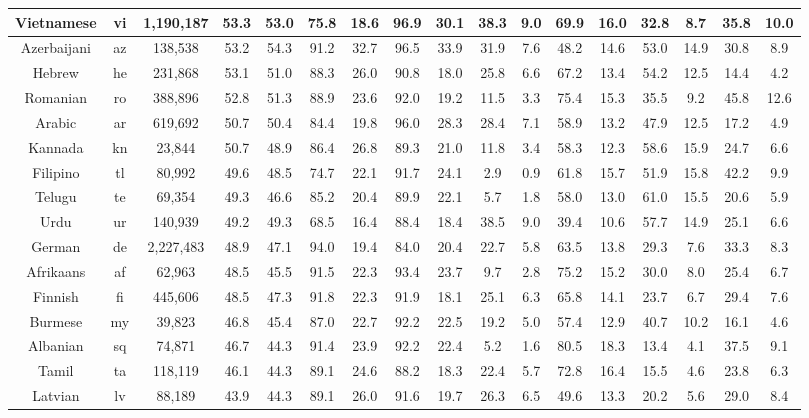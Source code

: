 \begin{table*}
{\begin{tabular}{|c|c|c||c|c|c|c|c|c|c|c|c|c|c|c|c|c|}
Vietnamese & vi & 1,190,187 & 53.3 & 53.0 & 75.8 & 18.6 & 96.9 & 30.1 & 38.3 & 9.0 & 69.9 & 16.0 & 32.8 & 8.7 & 35.8 & 10.0\\ \hline
Azerbaijani & az & 138,538 & 53.2 & 54.3 & 91.2 & 32.7 & 96.5 & 33.9 & 31.9 & 7.6 & 48.2 & 14.6 & 53.0 & 14.9 & 30.8 & 8.9\\ \hline
Hebrew & he & 231,868 & 53.1 & 51.0 & 88.3 & 26.0 & 90.8 & 18.0 & 25.8 & 6.6 & 67.2 & 13.4 & 54.2 & 12.5 & 14.4 & 4.2\\ \hline
Romanian & ro & 388,896 & 52.8 & 51.3 & 88.9 & 23.6 & 92.0 & 19.2 & 11.5 & 3.3 & 75.4 & 15.3 & 35.5 & 9.2 & 45.8 & 12.6\\ \hline
Arabic & ar & 619,692 & 50.7 & 50.4 & 84.4 & 19.8 & 96.0 & 28.3 & 28.4 & 7.1 & 58.9 & 13.2 & 47.9 & 12.5 & 17.2 & 4.9\\ \hline
Kannada & kn & 23,844 & 50.7 & 48.9 & 86.4 & 26.8 & 89.3 & 21.0 & 11.8 & 3.4 & 58.3 & 12.3 & 58.6 & 15.9 & 24.7 & 6.6\\ \hline
Filipino & tl & 80,992 & 49.6 & 48.5 & 74.7 & 22.1 & 91.7 & 24.1 & 2.9 & 0.9 & 61.8 & 15.7 & 51.9 & 15.8 & 42.2 & 9.9\\ \hline
Telugu & te & 69,354 & 49.3 & 46.6 & 85.2 & 20.4 & 89.9 & 22.1 & 5.7 & 1.8 & 58.0 & 13.0 & 61.0 & 15.5 & 20.6 & 5.9\\ \hline
Urdu & ur & 140,939 & 49.2 & 49.3 & 68.5 & 16.4 & 88.4 & 18.4 & 38.5 & 9.0 & 39.4 & 10.6 & 57.7 & 14.9 & 25.1 & 6.6\\ \hline
German & de & 2,227,483 & 48.9 & 47.1 & 94.0 & 19.4 & 84.0 & 20.4 & 22.7 & 5.8 & 63.5 & 13.8 & 29.3 & 7.6 & 33.3 & 8.3\\ \hline
Afrikaans & af & 62,963 & 48.5 & 45.5 & 91.5 & 22.3 & 93.4 & 23.7 & 9.7 & 2.8 & 75.2 & 15.2 & 30.0 & 8.0 & 25.4 & 6.7\\ \hline
Finnish & fi & 445,606 & 48.5 & 47.3 & 91.8 & 22.3 & 91.9 & 18.1 & 25.1 & 6.3 & 65.8 & 14.1 & 23.7 & 6.7 & 29.4 & 7.6\\ \hline
Burmese & my & 39,823 & 46.8 & 45.4 & 87.0 & 22.7 & 92.2 & 22.5 & 19.2 & 5.0 & 57.4 & 12.9 & 40.7 & 10.2 & 16.1 & 4.6\\ \hline
Albanian & sq & 74,871 & 46.7 & 44.3 & 91.4 & 23.9 & 92.2 & 22.4 & 5.2 & 1.6 & 80.5 & 18.3 & 13.4 & 4.1 & 37.5 & 9.1\\ \hline
Tamil & ta & 118,119 & 46.1 & 44.3 & 89.1 & 24.6 & 88.2 & 18.3 & 22.4 & 5.7 & 72.8 & 16.4 & 15.5 & 4.6 & 23.8 & 6.3\\ \hline
Latvian & lv & 88,189 & 43.9 & 44.3 & 89.1 & 26.0 & 91.6 & 19.7 & 26.3 & 6.5 & 49.6 & 13.3 & 20.2 & 5.6 & 29.0 & 8.4\\ \hline

\end{tabular}}
\end{table*}
